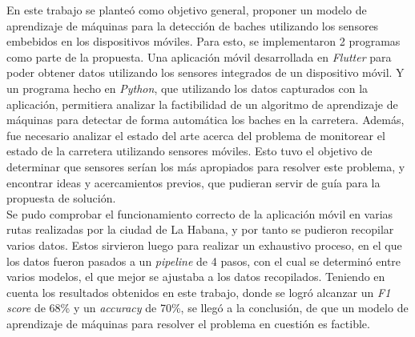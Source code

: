 \begin{conclusions}
	En este trabajo se planteó como objetivo general, proponer un modelo de aprendizaje de máquinas para la detección de baches
	utilizando los sensores embebidos en los dispositivos móviles. Para esto, se implementaron 2 programas como parte de la propuesta.
	Una aplicación móvil desarrollada en \emph{Flutter} para poder obtener datos utilizando los sensores integrados de un dispositivo
	móvil. Y un programa hecho en \emph{Python}, que utilizando los datos capturados con la aplicación, permitiera analizar la
	factibilidad de un algoritmo de aprendizaje de máquinas para detectar de forma automática los baches en la carretera. Además,
	fue necesario analizar el estado del arte acerca del problema de monitorear el estado de la carretera utilizando sensores móviles.
	Esto tuvo el objetivo de determinar que sensores serían los más apropiados para resolver este problema, y encontrar ideas y
	acercamientos previos, que pudieran servir de guía para la propuesta de solución.\\

	Se pudo comprobar el funcionamiento correcto de la aplicación móvil en varias rutas realizadas por la ciudad de La Habana, y 
	por tanto se pudieron recopilar varios datos. Estos sirvieron luego para realizar un exhaustivo proceso, en el que los datos 
	fueron pasados a un \emph{pipeline} de 4 pasos, con el cual se determinó entre varios modelos, el que mejor se ajustaba a los
	datos recopilados. Teniendo en cuenta los resultados obtenidos en este trabajo, donde se logró alcanzar un \emph{F1 score} de
	68\% y un \emph{accuracy} de 70\%, se llegó a la conclusión, de que un modelo de aprendizaje de máquinas para resolver el
	problema en cuestión es factible.
\end{conclusions}
